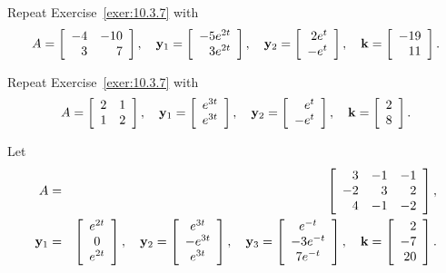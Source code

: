 \begin{exerciselist}
  \item\label{exer:10.3.9} Repeat Exercise~\ref{exer:10.3.7} with
  \[
    A=\left[\begin{array}{rr} -4&-10\\3&7\end{array}\right], \quad{\bf y}_{1}=\left[
    \begin{array}{r}
      -5e^{2t} \\
      3e^{2t}
    \end{array}\right], \quad{\bf y}_{2}=\left[
    \begin{array}{r}
      2e^t \\
      -e^t
    \end{array}\right], \quad{\bf k}=\left[
    \begin{array}{r}
      -19 \\
      11
    \end{array}
    \right ].
  \]

  \item\label{exer:10.3.10} Repeat Exercise~\ref{exer:10.3.7} with
  \[
    A=\left[\begin{array}{rr} 2&1\\1&2\end{array}\right],\quad{\bf y}_{1}=\left[
    \begin{array}{r}
      e^{3t} \\
      e^{3t}
    \end{array}\right],\quad{\bf y}_{2}=\left[
    \begin{array}{r}
      e^{t}  \\
      -e^{t}
    \end{array}\right],\quad{\bf k}=\left[
    \begin{array}{r}
      2 \\
      8
    \end{array}\right].
  \]

  \item\label{exer:10.3.11} Let
  \begin{eqnarray*}
    A&=&\left[\begin{array}{rrr} 3&-1&-1\\-2&3&2\\4&-1&-2\end{array}\right],\\ {\bf y}_{1}&=&\left[
    \begin{array}{c}
      e^{2t} \\
      0      \\
      e^{2t}
    \end{array}
    \right],\quad {\bf y}_{2}=\left[
    \begin{array}{c}
      e^{3t}  \\
      -e^{3t} \\
      e^{3t}
    \end{array}\right],\quad {\bf y}_{3}=\left[
    \begin{array}{c}
      e^{-t}   \\
      -3e^{-t} \\
      7e^{-t}
    \end{array}\right],\quad{\bf k}=\left[
    \begin{array}{r}
      2  \\
      -7 \\
      20
    \end{array}\right].
  \end{eqnarray*}


\end{exerciselist}
